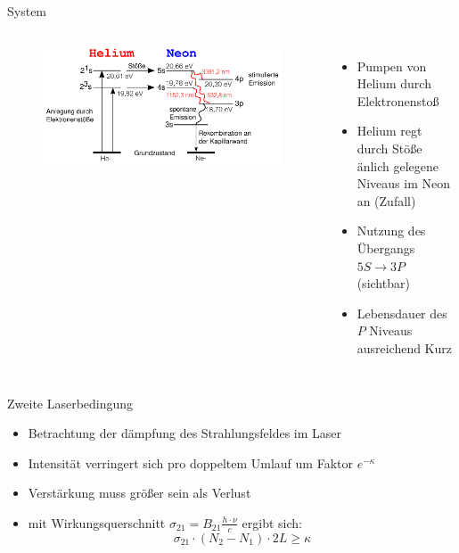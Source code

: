 \documentclass[10pt, aspectratio=169]{beamer}
\newcommand{\hne}{\ce{HeNe}}
\begin{document}
\begin{frame}{\hne{} System}
  \begin{columns}
    \begin{figure}[H]
      \includegraphics[width=1\columnwidth]{heneniv.png}
    \end{figure}
    \begin{itemize}
    \item<1-> Pumpen von Helium durch Elektronensto\ss{}
    \item<2-> Helium regt durch St\"o\ss{}e \"anlich gelegene Niveaus
      im Neon an (Zufall)
    \item<3-> Nutzung des \"Ubergangs \(5S\rightarrow 3P\) (sichtbar)
    \item<4-> Lebensdauer des \(P\) Niveaus ausreichend Kurz
    \end{itemize}
  \end{columns}
\end{frame}

\begin{frame}{Zweite Laserbedingung}
  \begin{itemize}
  \item<1-> Betrachtung der d\"ampfung des Strahlungsfeldes im Laser
  \item<2-> Intensität verringert sich pro doppeltem Umlauf um Faktor
    \(e^{-\kappa}\) 
  \item<3-> Verst\"arkung muss gr\"o\ss{}er sein als Verlust
  \item<4-> mit Wirkungsquerschnitt   \(\sigma_{21}=B_{21}\frac{h\cdot\nu}{c}\) ergibt
    sich:
    \begin{equation}
      \label{eq:zwlabe}
      \tag{zweite Laserbedingung}
      \sigma_{21}\cdot (N_2-N_1)\cdot 2L \geq \kappa
    \end{equation}
  \end{itemize}
\end{frame}
\end{document}
